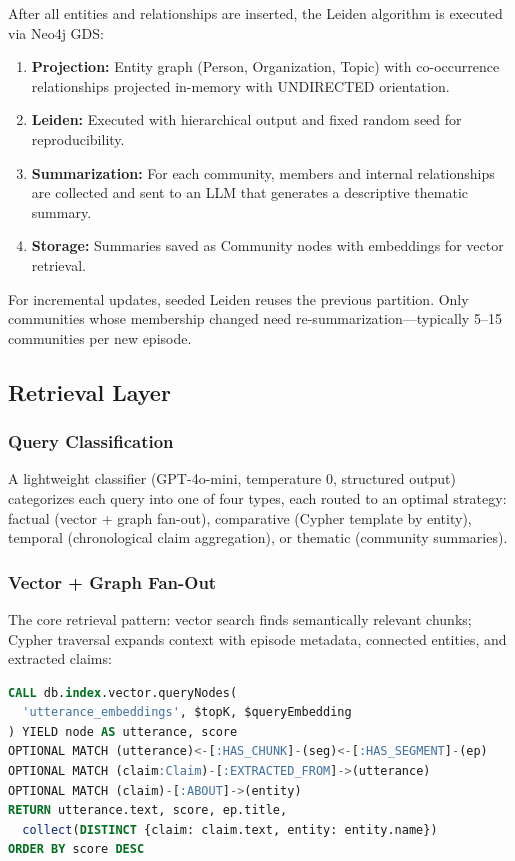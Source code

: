 After all entities and relationships are inserted, the Leiden algorithm is executed via Neo4j GDS:

\begin{enumerate}
    \item \textbf{Projection:} Entity graph (Person, Organization, Topic) with co-occurrence relationships projected in-memory with UNDIRECTED orientation.
    \item \textbf{Leiden:} Executed with hierarchical output and fixed random seed for reproducibility.
    \item \textbf{Summarization:} For each community, members and internal relationships are collected and sent to an LLM that generates a descriptive thematic summary.
    \item \textbf{Storage:} Summaries saved as Community nodes with embeddings for vector retrieval.
\end{enumerate}

For incremental updates, seeded Leiden reuses the previous partition. Only communities whose membership changed need re-summarization---typically 5--15 communities per new episode.

\subsection{Retrieval Layer}

\subsubsection{Query Classification}

A lightweight classifier (GPT-4o-mini, temperature 0, structured output) categorizes each query into one of four types, each routed to an optimal strategy: factual (vector + graph fan-out), comparative (Cypher template by entity), temporal (chronological claim aggregation), or thematic (community summaries).

\subsubsection{Vector + Graph Fan-Out}

The core retrieval pattern: vector search finds semantically relevant chunks; Cypher traversal expands context with episode metadata, connected entities, and extracted claims:

\begin{lstlisting}[language=SQL, caption={Vector search with graph fan-out}]
CALL db.index.vector.queryNodes(
  'utterance_embeddings', $topK, $queryEmbedding
) YIELD node AS utterance, score
OPTIONAL MATCH (utterance)<-[:HAS_CHUNK]-(seg)<-[:HAS_SEGMENT]-(ep)
OPTIONAL MATCH (claim:Claim)-[:EXTRACTED_FROM]->(utterance)
OPTIONAL MATCH (claim)-[:ABOUT]->(entity)
RETURN utterance.text, score, ep.title,
  collect(DISTINCT {claim: claim.text, entity: entity.name})
ORDER BY score DESC
\end{lstlisting}

